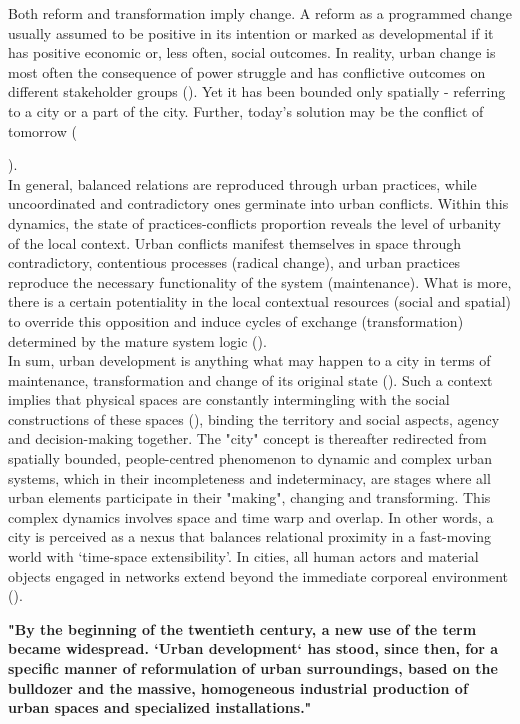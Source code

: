 \documentclass[11pt]{report}
\begin{document}
{{Both reform and transformation imply change.
A reform as a programmed change usually assumed to be positive in its intention or marked as developmental if it has positive economic or, less often, social outcomes. In reality, urban change is most often the consequence of power struggle and has conflictive outcomes on different stakeholder groups (\citealt{fainstein_just_2010}). Yet it has been bounded only spatially - referring to a city or a part of the city. Further, today’s solution may be the conflict of tomorrow  ({\citealt{holden_justifying_2015}).
\\

In general, balanced relations are reproduced through urban practices, while uncoordinated and contradictory ones germinate into urban conflicts. Within this dynamics, the state of practices-conflicts proportion reveals the level of urbanity of the local context. Urban conflicts manifest themselves in space through contradictory, contentious processes (radical change), and urban practices reproduce the necessary functionality of the system (maintenance). What is more, there is a certain potentiality in the local contextual resources (social and spatial) to override this opposition and induce cycles of exchange (transformation) determined by the mature system logic (\href{Galtung}{\citealt{galtung_peace_1996}}).
\\  

In sum, urban development is anything what may happen to a city in terms of maintenance, transformation and change of its original state (\href{Friedmann}{\citealt{friedmann_planning_1987}}).
Such a context implies that physical spaces are constantly intermingling with the social constructions of these spaces (\href{Firmino}{\citealt{firmino_pervasive_2008}}), binding the territory and social aspects, agency and decision-making together.
The "city" concept is thereafter redirected from spatially bounded, people-centred phenomenon to dynamic and complex urban systems, which in their incompleteness and indeterminacy, are stages where all urban elements participate in their "making", changing and transforming.
This complex dynamics involves space and time warp and overlap.
In other words, a city is perceived as a nexus that balances relational proximity in a fast-moving world with ‘time-space extensibility’.
In cities, all human actors and material objects engaged in networks extend beyond the immediate corporeal environment (\href{Graham}{\citealt{graham_splintering_2001}}).  

\textbf{"By the beginning of the twentieth century, a new use of the term became widespread. ‘Urban development‘ has stood, since then, for a specific manner of reformulation of urban surroundings, based on the bulldozer and the massive, homogeneous industrial production of urban spaces and specialized installations." \href{Esteva}{\cite{esteva_development_2010}}}

}}}
\end{document}
